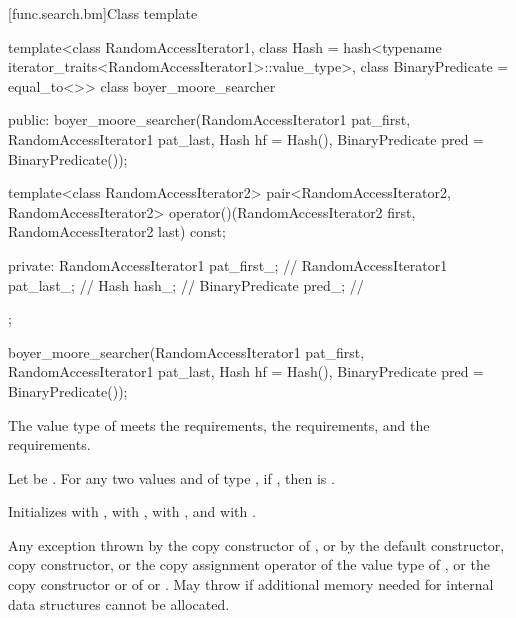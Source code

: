 [func.search.bm]{Class template }

%
\begin{codeblock}
template<class RandomAccessIterator1,
         class Hash = hash<typename iterator_traits<RandomAccessIterator1>::value_type>,
         class BinaryPredicate = equal_to<>>
  class boyer_moore_searcher {
  public:
    boyer_moore_searcher(RandomAccessIterator1 pat_first,
                         RandomAccessIterator1 pat_last,
                         Hash hf = Hash(),
                         BinaryPredicate pred = BinaryPredicate());

    template<class RandomAccessIterator2>
      pair<RandomAccessIterator2, RandomAccessIterator2>
        operator()(RandomAccessIterator2 first, RandomAccessIterator2 last) const;

  private:
    RandomAccessIterator1 pat_first_;   // \expos
    RandomAccessIterator1 pat_last_;    // \expos
    Hash hash_;                         // \expos
    BinaryPredicate pred_;              // \expos
  };
\end{codeblock}

%
\begin{itemdecl}
boyer_moore_searcher(RandomAccessIterator1 pat_first,
                     RandomAccessIterator1 pat_last,
                     Hash hf = Hash(),
                     BinaryPredicate pred = BinaryPredicate());
\end{itemdecl}

\begin{itemdescr}
\pnum
\expects
The value type of  meets
the  requirements,
the  requirements, and
the  requirements.

\pnum
\expects
Let  be .
For any two values  and  of type ,
if , then  is .

\pnum
\effects
Initializes
 with ,
 with ,
 with , and
 with .

\pnum
\throws
Any exception thrown by the copy constructor of ,
or by the default constructor, copy constructor, or the copy assignment operator of the value type of ,
or the copy constructor or  of  or .
May throw  if additional memory needed for internal data structures cannot be allocated.
\end{itemdescr}

